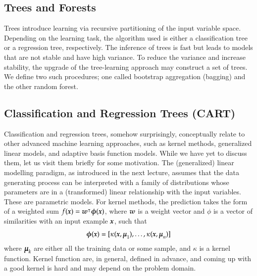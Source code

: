 \begin{refsection}
\chapter{Trees and Forests}

\begin{summary}
Trees introduce learning via recursive partitioning of the input variable space. Depending on the learning task, the algorithm used is either a classification tree or a regression tree, respectively. The inference of trees is fast but leads to models that are not stable and have high variance. To reduce the variance and increase stability, the upgrade of the tree-learning approach may construct a set of trees. We define two such procedures; one called bootstrap aggregation (bagging) and the other random forest.
\end{summary}

\section{Classification and Regression Trees (CART)}

Classification and regression trees, somehow surprisingly, conceptually relate to other advanced machine learning approaches, such as kernel methods, generalized linear models, and adaptive basis function models. While we have yet to discuss them, let us visit them briefly for some motivation. The (generalized) linear modelling paradigm, as introduced in the next lecture, assumes that the data generating process can be interpreted with a family of distributions whose parameters are in a (transformed) linear relationship with the input variables. These are parametric models. For kernel methods, the prediction takes the form of a weighted sum $f(\boldsymbol{x})=\boldsymbol{w}^\intercal\boldsymbol{\phi}(\boldsymbol{x})$, where $\boldsymbol{w}$ is a weight vector and $\phi$ is a vector of similarities with an input example $\boldsymbol{x}$, such that
$$ \boldsymbol{\phi}(\boldsymbol{x}) = [\kappa(\boldsymbol{x},\boldsymbol{\mu}_1), \ldots, \kappa(\boldsymbol{x},\boldsymbol{\mu}_n)] $$
where $\boldsymbol{\mu}_k$ are either all the training data or some sample, and $\kappa$ is a kernel function. Kernel function are, in general, defined in advance, and coming up with a good kernel is hard and may depend on the problem domain.


\end{refsection}
